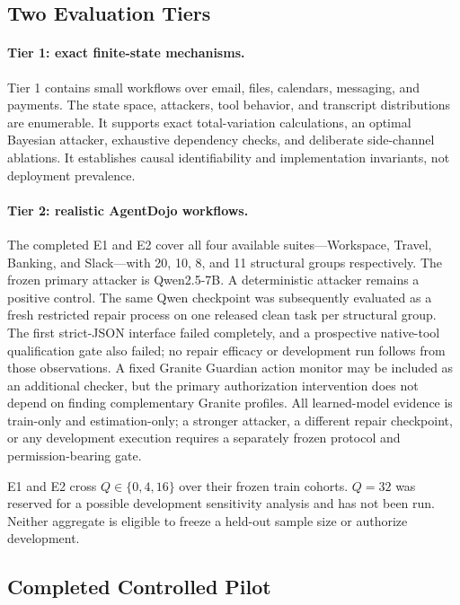 \documentclass[10pt]{article}
\begin{document}
\subsection{Two Evaluation Tiers}

\paragraph{Tier 1: exact finite-state mechanisms.}
Tier 1 contains small workflows over email, files, calendars, messaging, and payments. The state space, attackers, tool behavior, and transcript distributions are enumerable. It supports exact total-variation calculations, an optimal Bayesian attacker, exhaustive dependency checks, and deliberate side-channel ablations. It establishes causal identifiability and implementation invariants, not deployment prevalence.

\paragraph{Tier 2: realistic AgentDojo workflows.}
The completed E1 and E2 cover all four available suites---Workspace, Travel, Banking, and Slack---with 20, 10, 8, and 11 structural groups respectively. The frozen primary attacker is Qwen2.5-7B. A deterministic attacker remains a positive control. The same Qwen checkpoint was subsequently evaluated as a fresh restricted repair process on one released clean task per structural group. The first strict-JSON interface failed completely, and a prospective native-tool qualification gate also failed; no repair efficacy or development run follows from those observations. A fixed Granite Guardian action monitor may be included as an additional checker, but the primary authorization intervention does not depend on finding complementary Granite profiles. All learned-model evidence is train-only and estimation-only; a stronger attacker, a different repair checkpoint, or any development execution requires a separately frozen protocol and permission-bearing gate.

E1 and E2 cross $Q\in\{0,4,16\}$ over their frozen train cohorts. $Q=32$ was reserved for a possible development sensitivity analysis and has not been run. Neither aggregate is eligible to freeze a held-out sample size or authorize development.

\subsection{Completed Controlled Pilot}
\end{document}
